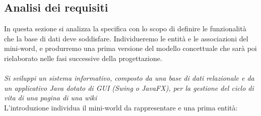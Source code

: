 \documentclass{article}
\begin{document}
\subsection{Analisi dei requisiti}
In questa sezione si analizza la specifica con lo scopo di definire le funzionalità
che la base di dati deve soddisfare. Individueremo le entità e le associazioni
del mini-word, e produrremo una prima versione del modello concettuale che
sarà poi rielaborato nelle fasi successive della progettazione.\\ \\
{\itshape Si sviluppi un sistema informativo, composto da una base di dati relazionale e da un applicativo Java dotato
	di GUI (Swing o JavaFX), per la gestione del ciclo di vita di una pagina di una wiki}
\vspace{0.5cm}
\\
L'introduzione individua il mini-world da rappresentare e una prima entità:
\end{document}
